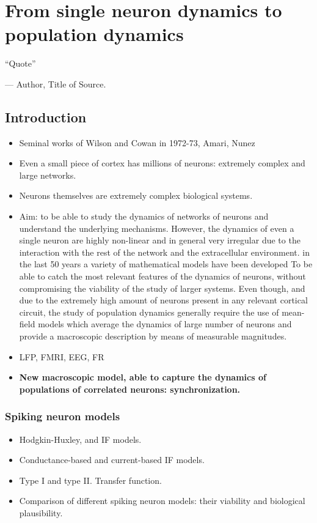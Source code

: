 \chapter{\bf From single neuron dynamics to population dynamics}
\label{cha:chap1}

\epigraph{``Quote''}{--- \textup{Author}, Title of Source.}

\section{Introduction}

\begin{itemize}
\item Seminal works of Wilson and Cowan in 1972-73, Amari, Nunez
\item Even a small piece of cortex has millions of neurons: extremely
complex and large networks.
\item Neurons themselves are extremely complex biological systems.
\item Aim: to be able to study the dynamics of networks of neurons and
understand the underlying mechanisms.
However, the dynamics of even a single neuron are highly non-linear
and in general very irregular due to the interaction with the rest
of the network and the extracellular environment.
 in the last 50 years a variety of mathematical models have been
 developed To be able to catch the most relevant features of the
 dynamics of neurons, without compromising
the viability of the study of  larger systems.  
Even though, and due to the extremely high amount of neurons present
in any relevant cortical circuit, the study of population dynamics
generally require the use of mean-field models which average the
dynamics of large number of neurons and provide a macroscopic
description by means of measurable magnitudes.
\item LFP, FMRI, EEG, FR
\item \textbf{New macroscopic model, able to capture the dynamics of
    populations of correlated neurons: synchronization.}
\end{itemize}

\subsection{Spiking neuron models}

\begin{itemize}
\item Hodgkin-Huxley, and IF models.
\item Conductance-based and current-based IF models.
\item Type I and type II. Transfer function.
\item Comparison of different spiking neuron models: their viability
  and biological plausibility.
\end{itemize}

